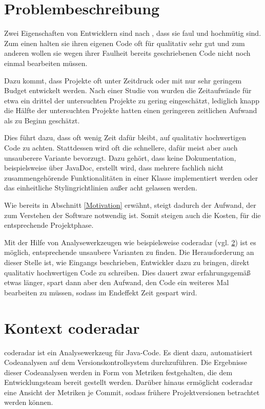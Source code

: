 \documentclass[
	oneside,  %
	ngerman, 
	final, 
	11pt, 
	a4paper, 
	1.1headlines, 
	headinclude=false, 
	footinclude=false, 
	mpinclude=false, 
	pagesize, 
	onecolumn, 
	titlepage, 
	parskip=half, 
	headsepline, 
	chapterprefix=false, 
	version=first, 
	listof=totoc, 
	bibliography=totoc, 
	toc=graduated, 
	fleqn
]{scrbook}
\begin{document}
\section{Problembeschreibung}
\label{Problembeschreibung}
Zwei Eigenschaften von Entwicklern sind nach \cite{WCSP1996}, dass sie faul und hochmütig sind.
Zum einen halten sie ihren eigenen Code oft für qualitativ sehr gut und zum anderen wollen sie wegen ihrer Faulheit bereits geschriebenen Code nicht noch einmal bearbeiten müssen.

Dazu kommt, dass Projekte oft unter Zeitdruck oder mit nur sehr geringem Budget entwickelt werden.
Nach einer Studie von \cite{KPME2002} wurden die Zeitaufwände für etwa ein drittel der untersuchten Projekte zu gering eingeschätzt, lediglich knapp die Hälfte der untersuchten Projekte hatten einen geringeren zeitlichen Aufwand als zu Beginn geschätzt.

Dies führt dazu, dass oft wenig Zeit dafür bleibt, auf qualitativ hochwertigen Code zu achten.
Stattdessen wird oft die schnellere, dafür meist aber auch unsauberere Variante bevorzugt.
Dazu gehört, dass keine Dokumentation, beispielsweise über JavaDoc, erstellt wird, dass mehrere fachlich nicht zusammengehörende Funktionalitäten in einer Klasse implementiert werden oder das einheitliche Stylingrichtlinien außer acht gelassen werden. 

Wie bereits in Abschnitt \ref{Motivation} erwähnt, steigt dadurch der Aufwand, der zum Verstehen der Software notwendig ist.
Somit steigen auch die Kosten, für die entsprechende Projektphase.

Mit der Hilfe von Analysewerkzeugen wie beispielsweise coderadar (vgl. \ref{Kontext}) ist es möglich, entsprechende unsaubere Varianten zu finden.
Die Herausforderung an dieser Stelle ist, wie Eingangs beschrieben, Entwickler dazu zu bringen, direkt qualitativ hochwertigen Code zu schreiben.
Dies dauert zwar erfahrungsgemäß etwas länger, spart dann aber den Aufwand, den Code ein weiteres Mal bearbeiten zu müssen, sodass im Endeffekt Zeit gespart wird.

\section{Kontext coderadar}
\label{Kontext}
coderadar ist ein Analysewerkzeug für Java-Code.
Es dient dazu, automatisiert Codeanalysen auf dem Versionskontrollsystem durchzuführen.
Die Ergebnisse dieser Codeanalysen werden in Form von Metriken festgehalten, die dem Entwicklungsteam bereit gestellt werden.
Darüber hinaus ermöglicht coderadar eine Ansicht der Metriken je Commit, sodass frühere Projektversionen betrachtet werden können.
\end{document}
